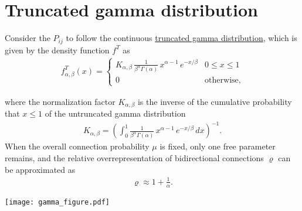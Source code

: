 
\section*{Truncated gamma distribution}

Consider the $P_{ij}$ to follow the continuous \underline{truncated gamma distribution}, which is given by the density function $f^T$ as
\begin{align}
  f_{\alpha,\beta}^T(x) = \begin{cases} K_{\alpha, \beta}\,
\frac{1}{\beta^{\alpha}\Gamma(\alpha)}\, x^{\alpha-1}\,e^{-x/\beta} & 0 \leq x \leq 1 \\
0 & \text{otherwise},
\end{cases}
\end{align}

where the normalization factor $K_{\alpha,\beta}$ is the inverse of the cumulative
probability that $x \leq 1$ of the untruncated gamma distribution 
\begin{align}
  K_{\alpha,\beta} = \left(\int_0^{1} \frac{1}{\beta^{\alpha}\Gamma(\alpha)}\, x^{\alpha-1}\,e^{-x/\beta} \, dx \right)^{-1}.
\end{align}
When the overall connection probability $\mu$ is fixed, only one free parameter remains, and the relative overrepresentation of bidirectional connections $\varrho$ can be approximated as
\begin{align}
 \varrho \approx  1 + \frac{1}{\alpha}.
\end{align}

\begin{center}\vspace{1cm}
\texttt{[image: gamma\_figure.pdf]}
\end{center}\vspace{1cm}
